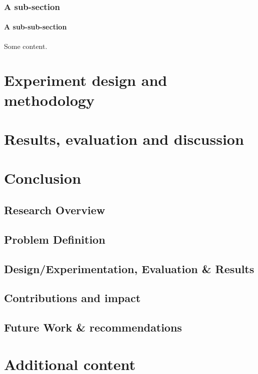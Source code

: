 \documentclass[oneside,12pt]{book}
\begin{document}
\subsection{A sub-section}

\subsubsection{A sub-sub-section}

\par Some content.



\chapter{Experiment design and methodology}



\chapter{Results, evaluation and discussion}


\chapter{Conclusion}
\section{Research Overview}

\section{Problem Definition}

\section{Design/Experimentation, Evaluation \& Results}

\section{Contributions and impact}

\section{Future Work \& recommendations}





\appendix
\chapter{Additional content}
\end{document}
